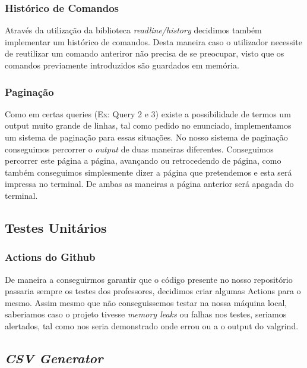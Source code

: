 \documentclass{article}
\begin{document}
        \subsubsection{Histórico de Comandos}
            Através da utilização da biblioteca \emph{readline/history} decidimos também implementar um 
            histórico de comandos. Desta maneira caso o utilizador necessite de reutilizar um comando 
            anteriror não precisa de se preocupar, visto que os comandos previamente introduzidos são 
            guardados em memória.
        \subsubsection{Paginação}
            Como em certas queries (Ex: Query 2 e 3) existe a possibilidade de termos um output muito 
            grande de linhas, tal como pedido no enunciado, implementamos um sistema de paginação para
            essas situações. No nosso sistema de paginação conseguimos percorrer o \emph{output} de duas 
            maneiras diferentes. Conseguimos percorrer este página a página, avançando ou retrocedendo de
            página, como também conseguimos simplesmente dizer a página que pretendemos e esta será impressa 
            no terminal. De ambas as maneiras a página anterior será apagada do terminal.
    \subsection{Testes Unitários}
        \subsubsection{Actions do Github}
        De maneira a conseguirmos garantir que o código presente no nosso repositório passaria sempre os
        testes dos professores, decidimos criar algumas Actions para o mesmo. Assim mesmo que não
        conseguissemos testar na nossa máquina local, saberiamos caso o projeto tivesse \emph{memory
        leaks} ou falhas nos testes, seriamos alertados, tal como nos seria demonstrado onde errou ou a o
        output do valgrind.
    \subsection{\emph{CSV Generator}}
\end{document}
